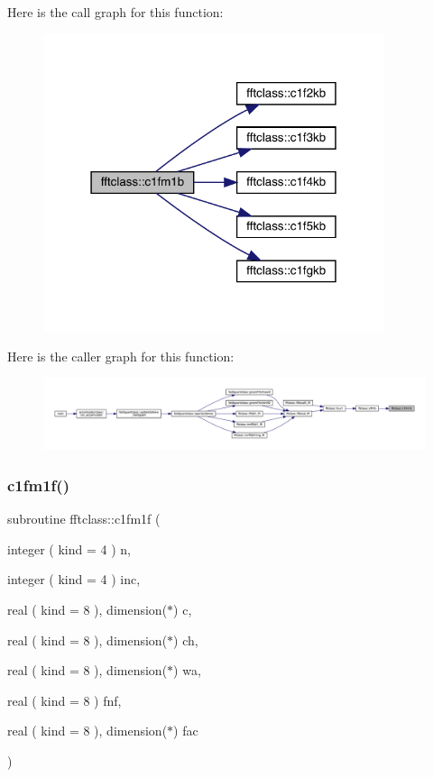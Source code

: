 Here is the call graph for this function\+:\nopagebreak
\begin{figure}[H]
\begin{center}
\leavevmode
\includegraphics[width=283pt]{namespacefftclass_a2f5368919279e1986ee34764caa05fe0_cgraph}
\end{center}
\end{figure}
Here is the caller graph for this function\+:\nopagebreak
\begin{figure}[H]
\begin{center}
\leavevmode
\includegraphics[width=350pt]{namespacefftclass_a2f5368919279e1986ee34764caa05fe0_icgraph}
\end{center}
\end{figure}
\mbox{\label{namespacefftclass_a8870afa6b2bab24460d719026aa6e0d8}} 
\subsubsection{\texorpdfstring{c1fm1f()}{c1fm1f()}}
{\footnotesize\ttfamily subroutine fftclass\+::c1fm1f (\begin{DoxyParamCaption}\item[{integer ( kind = 4 )}]{n,  }\item[{integer ( kind = 4 )}]{inc,  }\item[{real ( kind = 8 ), dimension($\ast$)}]{c,  }\item[{real ( kind = 8 ), dimension($\ast$)}]{ch,  }\item[{real ( kind = 8 ), dimension($\ast$)}]{wa,  }\item[{real ( kind = 8 )}]{fnf,  }\item[{real ( kind = 8 ), dimension($\ast$)}]{fac }\end{DoxyParamCaption})}

